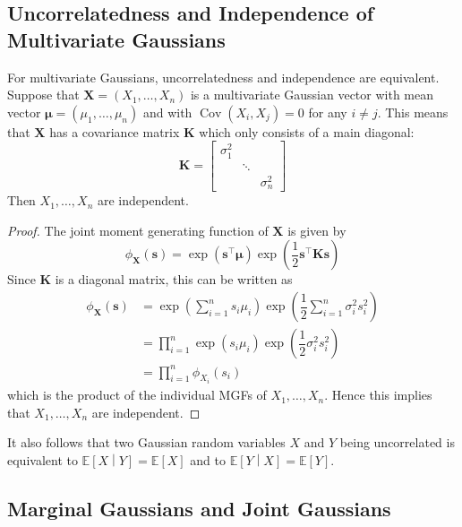 \documentclass[11pt]{report} %
\begin{document}
\subsection{Uncorrelatedness and Independence of Multivariate Gaussians}

For multivariate Gaussians, uncorrelatedness and independence are equivalent. Suppose that $\mathbf{X} = \left(X_{1}, \dots, X_{n}\right)$ is a multivariate Gaussian vector with mean vector $\boldsymbol{\mu} = \left(\mu_{1}, \dots, \mu_{n}\right)$ and with $\operatorname{Cov}\left(X_{i}, X_{j}\right) = 0$ for any $i \neq j$. This means that $\mathbf{X}$ has a covariance matrix $\mathbf{K}$ which only consists of a main diagonal:
\begin{equation}
\mathbf{K} = \begin{bmatrix}\sigma_{1}^{2} \\ & \ddots \\ & & \sigma_{n}^{2}\end{bmatrix}
\end{equation}
Then $X_{1}, \dots, X_{n}$ are independent.
\begin{proof}
The joint moment generating function of $\mathbf{X}$ is given by
\begin{equation}
\phi_{\mathbf{X}}\left(\mathbf{s}\right) = \exp\left(\mathbf{s}^{\top}\boldsymbol{\mu}\right)\exp\left(\dfrac{1}{2}\mathbf{s}^{\top}\mathbf{K}\mathbf{s}\right)
\end{equation}
Since $\mathbf{K}$ is a diagonal matrix, this can be written as
\begin{align}
\phi_{\mathbf{X}}\left(\mathbf{s}\right) &= \exp\left(\sum_{i = 1}^{n}s_{i}\mu_{i}\right)\exp\left(\dfrac{1}{2}\sum_{i = 1}^{n}\sigma_{i}^{2}s_{i}^{2}\right) \\
&= \prod_{i = 1}^{n}\exp\left(s_{i}\mu_{i}\right)\exp\left(\dfrac{1}{2}\sigma_{i}^{2}s_{i}^{2}\right) \\
&= \prod_{i = 1}^{n}\phi_{X_{i}}\left(s_{i}\right)
\end{align}
which is the product of the individual MGFs of $X_{1}, \dots, X_{n}$. Hence this implies that $X_{1}, \dots, X_{n}$ are independent.
\end{proof}

It also follows that two Gaussian random variables $X$ and $Y$ being uncorrelated is equivalent to $\mathbb{E}\left[X\middle|Y\right] = \mathbb{E}\left[X\right]$ and to $\mathbb{E}\left[Y\middle|X\right] = \mathbb{E}\left[Y\right]$.

\subsection{Marginal Gaussians and Joint Gaussians}
\end{document}

